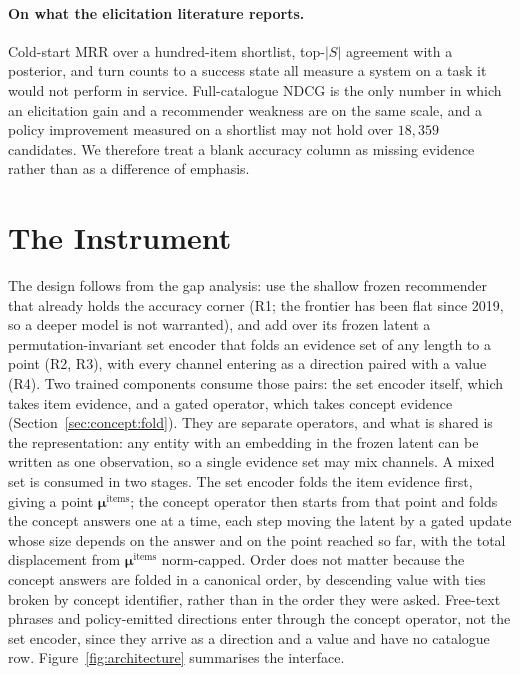 \documentclass[manuscript,screen,review]{acmart}
\newcommand{\bmu}{\boldsymbol{\mu}}
\begin{document}
\paragraph{On what the elicitation literature reports.} Cold-start MRR over a hundred-item shortlist, top-$|S|$ agreement with a posterior, and turn counts to a success state all measure a system on a task it would not perform in service. Full-catalogue NDCG is the only number in which an elicitation gain and a recommender weakness are on the same scale, and a policy improvement measured on a shortlist may not hold over $18{,}359$ candidates. We therefore treat a blank accuracy column as missing evidence rather than as a difference of emphasis.

\section{The Instrument}\label{sec:method}

The design follows from the gap analysis: use the shallow frozen recommender that already holds the accuracy corner (R1; the frontier has been flat since 2019, so a deeper model is not warranted), and add over its frozen latent a permutation-invariant set encoder that folds an evidence set of any length to a point (R2, R3), with every channel entering as a direction paired with a value (R4). Two trained components consume those pairs: the set encoder itself, which takes item evidence, and a gated operator, which takes concept evidence (Section~\ref{sec:concept:fold}). They are separate operators, and what is shared is the representation: any entity with an embedding in the frozen latent can be written as one observation, so a single evidence set may mix channels. A mixed set is consumed in two stages. The set encoder folds the item evidence first, giving a point $\bmu^{\text{items}}$; the concept operator then starts from that point and folds the concept answers one at a time, each step moving the latent by a gated update whose size depends on the answer and on the point reached so far, with the total displacement from $\bmu^{\text{items}}$ norm-capped. Order does not matter because the concept answers are folded in a canonical order, by descending value with ties broken by concept identifier, rather than in the order they were asked. Free-text phrases and policy-emitted directions enter through the concept operator, not the set encoder, since they arrive as a direction and a value and have no catalogue row. Figure~\ref{fig:architecture} summarises the interface.
\end{document}
